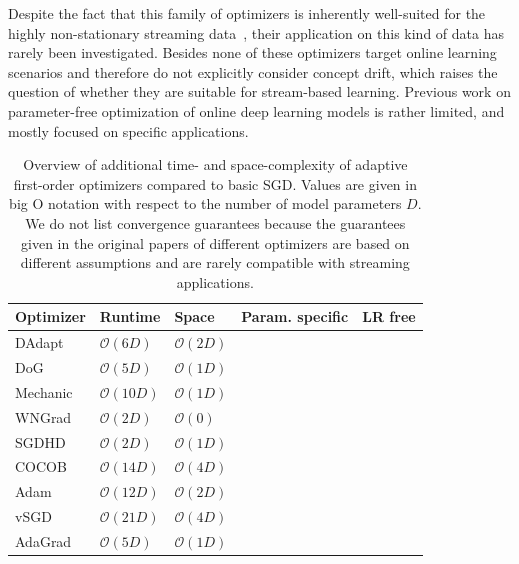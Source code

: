 \documentclass[letterpaper]{article} %
\newcommand{\cmark}{\ding{51}} %
\newcommand{\xmark}{\ding{55}} %
\begin{document}
Despite the fact that this family of optimizers is inherently well-suited for the highly non-stationary streaming data~\cite{schaulNoMorePesky2013}, their application on this kind of data has rarely been investigated.
Besides \citet{schaulNoMorePesky2013} none of these optimizers target online learning scenarios and therefore do not explicitly consider concept drift, which raises the question of whether they are suitable for stream-based learning.
Previous work on parameter-free optimization of online deep learning models is rather limited, and mostly focused on specific applications.

\begin{table}[ht]
	\centering
	\small
	\begin{tabular}{@{}lllcc@{}}
		\toprule
		Optimizer & Runtime                            & Space             & Param. specific & LR free \\ \midrule
		DAdapt    & $\mathcal{O}(6D)$               & $\mathcal{O}(2D)$ & \xmark          & \cmark  \\
		DoG       & $\mathcal{O}(5D)$               & $\mathcal{O}(1D)$ & \xmark          & \cmark  \\
		Mechanic  & $\mathcal{O}(10D)$              & $\mathcal{O}(1D)$ & \xmark          & \cmark  \\
		WNGrad    & $\mathcal{O}(2D)$               & $\mathcal{O}(0)$  & \xmark          & \cmark  \\
		SGDHD     & $\mathcal{O}(2D)$               & $\mathcal{O}(1D)$ & \xmark          & \cmark  \\
		COCOB     & $\mathcal{O}(14D)$              & $\mathcal{O}(4D)$ & \cmark          & \cmark  \\
		Adam      & $\mathcal{O}(12D)$              & $\mathcal{O}(2D)$ & \cmark          & \xmark  \\
		vSGD      & $\mathcal{O}(21D)$\footnotemark & $\mathcal{O}(4D)$ & \cmark          & \cmark  \\
		AdaGrad   & $\mathcal{O}(5D)$               & $\mathcal{O}(1D)$ & \cmark          & \xmark  \\ \bottomrule
	\end{tabular}
	\caption{Overview of additional time- and space-complexity of adaptive first-order optimizers compared to basic SGD. Values are given in big O notation with respect to the number of model parameters $D$. We do not list convergence guarantees because the guarantees given in the original papers of different optimizers are based on different assumptions and are rarely compatible with streaming applications.}\label{tab:param_free_optims}
\end{table}
\end{document}
